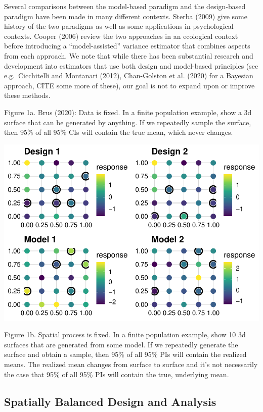 \documentclass[]{elsarticle} %
\begin{document}
Several comparisons between the model-based paradigm and the
design-based paradigm have been made in many different contexts. Sterba
(2009) give some history of the two paradigms as well as some
applications in psychological contexts. Cooper (2006) review the two
approaches in an ecological context before introducing a
``model-assisted'' variance estimator that combines aspects from each
approach. We note that while there has been substantial research and
development into estimators that use both design and model-based
principles (see e.g.~Cicchitelli and Montanari (2012), Chan-Golston et
al. (2020) for a Bayesian approach, CITE some more of these), our goal
is not to expand upon or improve these methods.

Figure 1a. Brus (2020): Data is fixed. In a finite population example,
show a 3d surface that can be generated by anything. If we repeatedly
sample the surface, then 95\% of all 95\% CIs will contain the true
mean, which never changes.

\includegraphics[width=0.85\linewidth]{SpatialDVM_Manuscript_files/figure-latex/unnamed-chunk-2-1}

Figure 1b. Spatial process is fixed. In a finite population example,
show 10 3d surfaces that are generated from some model. If we repeatedly
generate the surface and obtain a sample, then 95\% of all 95\% PIs will
contain the realized means. The realized mean changes from surface to
surface and it's not necessarily the case that 95\% of all 95\% PIs will
contain the true, underlying mean.

\hypertarget{spatially-balanced-design-and-analysis}{%
\subsection{Spatially Balanced Design and
Analysis}\label{spatially-balanced-design-and-analysis}}
\end{document}
